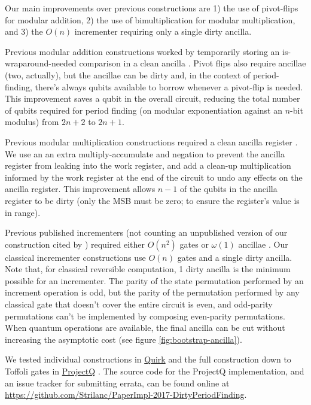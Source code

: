 \documentclass[twocolumn]{article}
\begin{document}
Our main improvements over previous constructions are 1) the use of pivot-flips for modular addition, 2) the use of bimultiplication for modular multiplication, and 3) the $O(n)$ incrementer requiring only a single dirty ancilla.

Previous modular addition constructions worked by temporarily storing an is-wraparound-needed comparison in a clean ancilla \cite{takahashi2006, haner2016}.
Pivot flips also require ancillae (two, actually), but the ancillae can be dirty and, in the context of period-finding, there's always qubits available to borrow whenever a pivot-flip is needed.
This improvement saves a qubit in the overall circuit, reducing the total number of qubits required for period finding (on modular exponentiation against an $n$-bit modulus) from $2n+2$ to $2n+1$.

Previous modular multiplication constructions required a clean ancilla register \cite{haner2016}.
We use an an extra multiply-accumulate and negation to prevent the ancilla register from leaking into the work register, and add a clean-up multiplication informed by the work register at the end of the circuit to undo any effects on the ancilla register.
This improvement allows $n-1$ of the qubits in the ancilla register to be dirty (only the MSB must be zero; to ensure the register's value is in range).

Previous published incrementers (not counting an unpublished version of our construction \cite{gidney2015} cited by \cite{haner2016}) required either $O(n^2)$ gates or $\omega(1)$ ancillae \cite{draper2000, barenco1995}.
Our classical incrementer constructions use $O(n)$ gates and a single dirty ancilla.
Note that, for classical reversible computation, 1 dirty ancilla is the minimum possible for an incrementer.
The parity of the state permutation performed by an increment operation is odd, but the parity of the permutation performed by any classical gate that doesn't cover the entire circuit is even, and odd-parity permutations can't be implemented by composing even-parity permutations.
When quantum operations are available, the final ancilla can be cut without increasing the asymptotic cost (see figure \ref{fig:bootstrap-ancilla}).

We tested individual constructions in \href{https://github.com/Strilanc/Quirk}{Quirk} \cite{quirk2016} and the full construction down to Toffoli gates in \href{https://github.com/ProjectQ-Framework/ProjectQ}{ProjectQ} \cite{projq2016}.
The source code for the ProjectQ implementation, and an issue tracker for submitting errata, can be found online at \href{https://github.com/Strilanc/PaperImpl-2017-DirtyPeriodFinding}{https://github.com/Strilanc/PaperImpl-2017-DirtyPeriodFinding}.
\end{document}
